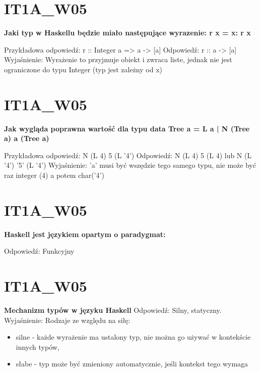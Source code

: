 \section{IT1A\_W05} 
\textbf{Jaki typ w Haskellu będzie miało następujące wyrazenie: r x = x: r x}

\vspace{0.4cm}
Przykładowa odpowiedź: r :: Integer a => a -> [a] \newline
Odpowiedź: r :: a -> [a] \newline
Wyjaśnienie: Wyrażenie to przyjmuje obiekt i zwraca liste, jednak nie jest ograniczone do typu Integer (typ jest zależny od x)

\section{IT1A\_W05} 
\textbf{Jak wygląda poprawna wartość dla typu data Tree a = L a | N (Tree a) a (Tree a)}

\vspace{0.4cm}
Przykładowa odpowiedź: N (L 4) 5 (L ’4’) \newline
Odpowiedź: N (L 4) 5 (L 4) lub N (L '4') '5' (L ’4’) \newline
Wyjaśnienie: 'a' musi być wszędzie tego samego typu, nie może być raz integer (4) a potem char('4') 

\section{IT1A\_W05} 
\textbf{Haskell jest językiem opartym o paradygmat:}

\vspace{0.4cm}
Odpowiedź: Funkcyjny

\section{IT1A\_W05} 
\textbf{Mechanizm typów w języku Haskell}
Odpowiedź: Silny, statyczny.\newline
Wyjaśnienie:\newline
Rodzaje ze względu na siłę:
\begin{itemize}
\item silne - każde wyrażenie ma ustalony typ, nie można go używać w kontekście innych typów,
\item słabe - typ może być zmieniony automatycznie, jeśli kontekst tego wymaga
\end{itemize}

